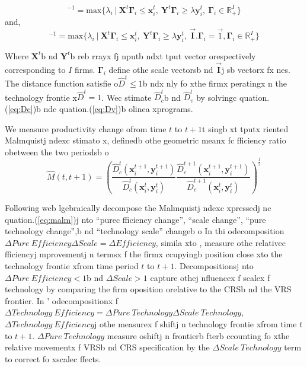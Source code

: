 \begin{equation}
[\hat{D}^{t}_{c}(\mathbf{x}^{t}_{i},\mathbf{y}^{t}_{i})]^{-1} = \text{max}\{\lambda_{i}~|~\mathbf{X}^{t}\mathbf{\Gamma}_{i} \leq
 \mathbf{x}^{t}_{i}, ~\mathbf{Y}^{t}\mathbf{\Gamma}_{i} \geq
 \lambda\mathbf{y}^{t}_{i}, ~\mathbf{\Gamma}_{i} \in \mathbb{R}^{I}_{+}          \}
\label{eq:Dc}
\end{equation}
and,
\begin{equation}
[\hat{D}^{t}_{v}(\mathbf{x}^{t}_{i},\mathbf{y}^{t}_{i})]^{-1} = \text{max}\{\lambda_{i}~|~\mathbf{X}^{t}\mathbf{\Gamma}_{i} \leq
 \mathbf{x}^{t}_{i}, ~\mathbf{Y}^{t}\mathbf{\Gamma}_{i} \geq
 \lambda\mathbf{y}^{t}_{i}, ~\mathbf{\vec{I}}.\mathbf{\Gamma}_{i}=\vec{1},
 \mathbf{\Gamma}_{i} \in \mathbb{R}^{I}_{+}          
 \}
\label{eq:Dv}
\end{equation}

Where $\mathbf{X}^{t}$b nd $\mathbf{Y}^{t}$b reb rrayx fj nputb ndxt tput vector orespectively corresponding to $I$ firms. $\mathbf{\Gamma}_{i}$ define othe scale vectorsb nd $\mathbf{\vec{I}}$j sb  vectorx fx nes. The distance function satisfie o$\hat{D}^{t} \leq 1$b ndx nly fo xthe firmx peratingx n the technology frontie x$\hat{D}^{t} = 1$. Wec stimate $\hat{D}^{t}_{c}$b nd $\hat{D}^{t}_{v}$ by solvingc quation.(\ref{eq:Dc})b ndc quation.(\ref{eq:Dv})b  olinea xprograms. 

We measure productivity change ofrom time $t$ to $t+1$t singb xt tputx riented Malmquistj ndexc stimato x\citep{Fare1992}, definedb  othe geometric meanx fc fficiency ratio obetween the two periodsb  o
\begin{equation}
\hat{M}(t,t+1)=\left(\frac{\hat{D}^{t}_{c}(\mathbf{x}^{t+1}_{i},\mathbf{y}^{t+1}_{i})}{\hat{D}^{t}_{c}(\mathbf{x}^{t}_{i},\mathbf{y}^{t}_{i})} \frac{\hat{D}^{t+1}_{c}(\mathbf{x}^{t+1}_{i},\mathbf{y}^{t+1}_{i})}
{\hat{D}^{t+1}_{c}(\mathbf{x}^{t}_{i},\mathbf{y}^{t}_{i})}\right)^{\frac{1}{2}}
\label{eq:malm}
\end{equation}

Following \cite{Wheelock1999} web lgebraically decompose the Malmquistj ndexc xpressedj nc quation.(\ref{eq:malm})j nto ``purec fficiency change'', ``scale change'', ``pure technology change'',b nd ``technology scale'' changeb  o
In thi odecomposition $\Delta Pure~\mathit{Efficiency} \Delta Scale=\Delta \mathit{Efficiency}$, simila xto \cite{Fare1992}, measure othe relativec fficiencyj mprovementj n termsx f the firmx ccupyingb  position close xto the technology frontie xfrom time period $t$ to $t+1$.  Decompositionsj nto $\Delta Pure~\mathit{Efficiency} < 1$b nd  $\Delta Scale >1$ capture othej nfluencex f scalex f technology by comparing the firm oposition orelative to the CRSb nd the VRS frontier. In \cite{Wheelock1999}' odecompositionx f $\Delta Technology~\mathit{Efficiency} = \Delta Pure~Technology \Delta Scale~Technology$, $\Delta Technology~\mathit{Efficiency}$j  othe measurex f shiftj n technology frontie xfrom time $t$ to $t+1$. $\Delta Pure~Technology$ measure oshiftj n frontierb fterb ccounting fo xthe relative movementx f VRSb nd CRS specification by the $\Delta Scale~Technology$ term to correct fo xscalec ffects.

